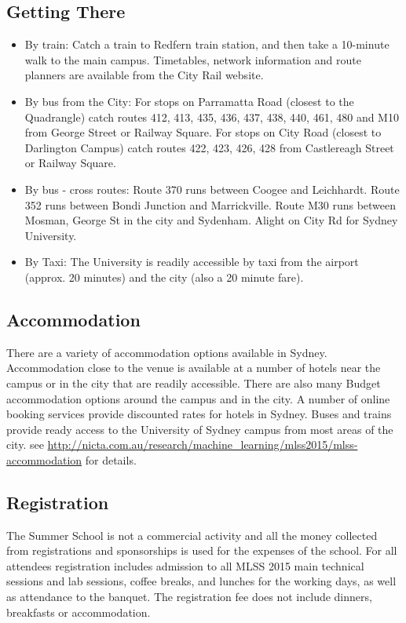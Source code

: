 \subsection*{Getting There}
\begin{itemize}
 \item By train: Catch a train to Redfern train station, and then take a 10-minute walk to the main campus. Timetables, network information and route planners are available from the City Rail website.
\item By bus from the City: For stops on Parramatta Road (closest to the Quadrangle) catch routes 412, 413, 435, 436, 437, 438, 440, 461, 480 and M10 from George Street or Railway Square.
For stops on City Road (closest to Darlington Campus) catch routes 422, 423, 426, 428 from Castlereagh Street or Railway Square.
\item By bus - cross routes: Route 370 runs between Coogee and Leichhardt. 
Route 352 runs between Bondi Junction and Marrickville.
Route M30 runs between Mosman, George St in the city and Sydenham. Alight on City Rd for Sydney University.
\item By Taxi: The University is readily accessible by taxi from the airport (approx. 20 minutes) and the city (also a 20 minute fare).
\end{itemize}
%
{}
\subsection*{Accommodation}
There are a variety of accommodation options available in Sydney. Accommodation close to the  venue is available
at a number of hotels near the campus or in the city that are readily accessible. 
There are also many Budget accommodation options around the campus and in the city. A number of online booking services provide discounted rates for hotels in Sydney. Buses and trains provide ready access to the University of Sydney campus from most areas of the city. see \url{http://nicta.com.au/research/machine_learning/mlss2015/mlss-accommodation} for details.
%
{}
\subsection*{Registration}
The Summer School is not a commercial activity and all the money collected from registrations and sponsorships is used for the expenses 
of the school. For all attendees registration includes admission to all MLSS 2015 main technical sessions
and lab sessions, coffee breaks, and lunches for the working days, 
as well as attendance to the banquet. 
The registration fee does not include dinners, breakfasts or accommodation. 
%
%
\newpage
{}
{}
